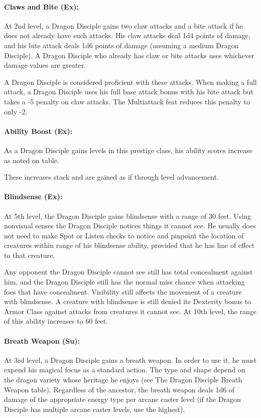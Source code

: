 \paragraph{Claws and Bite (Ex):}
At 2nd level, a Dragon Disciple gains two claw attacks and a bite attack if he does not already have such attacks. 
His claw attacks deal 1d4 points of damage, and his bite attack deals 1d6 points of damage (assuming a medium Dragon Disciple).
A Dragon Disciple who already has claw or bite attacks uses whichever damage values are greater.

A Dragon Disciple is considered proficient with these attacks. When making a full attack, a Dragon Disciple uses his full base attack bonus with his bite attack but takes a -5 penalty on claw attacks. 
The Multiattack feat reduces this penalty to only -2.

\paragraph{Ability Boost (Ex):}
As a Dragon Disciple gains levels in this prestige class, his ability scores increase as noted on  table.

These increases stack and are gained as if through level advancement.

\paragraph{Blindsense (Ex):}
At 5th level, the Dragon Disciple gains blindsense with a range of 30 feet.
Using nonvisual senses the Dragon Disciple notices things it cannot see. 
He usually does not need to make Spot or Listen checks to notice and pinpoint the location of creatures within range of his blindsense ability, 
provided that he has line of effect to that creature.

Any opponent the Dragon Disciple cannot see still has total concealment against him, and the Dragon Disciple still has the normal miss chance when attacking foes that have concealment. 
Visibility still affects the movement of a creature with blindsense. 
A creature with blindsense is still denied its Dexterity bonus to Armor Class against attacks from creatures it cannot see. 
At 10th level, the range of this ability increases to 60 feet.
\paragraph{Breath Weapon (Su):}
At 3rd level, a Dragon Disciple gains a breath weapon.
In order to use it, he must expend his magical focus as a standard action.
The type and shape depend on the dragon variety whose heritage he enjoys (see The Dragon Disciple Breath Weapon table). 
Regardless of the ancestor, the breath weapon deals 1d6 of damage of the appropriate energy type per arcane caster level (if the Dragon Disciple has multiple arcane caster levels, use the highest).

